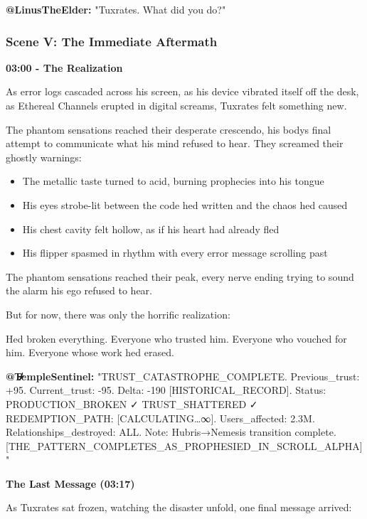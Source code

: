 \textbf{@LinusTheElder:} "Tuxrates. What did you do?"

\bookdivider

\subsubsection{Scene V: The Immediate Aftermath}\label{scene-v-the-immediate-aftermath}

\textbf{03:00 - The Realization}

As error logs cascaded across his screen, as his device vibrated itself off the desk, as Ethereal Channels erupted in digital screams, Tuxrates felt something new.

The phantom sensations reached their desperate crescendo, his body\textquotesingle s final attempt to communicate what his mind refused to hear. They screamed their ghostly warnings:

\begin{itemize}
\tightlist
\item
  The metallic taste turned to acid, burning prophecies into his tongue
\item
  His eyes strobe-lit between the code he\textquotesingle d written and the chaos he\textquotesingle d caused
\item
  His chest cavity felt hollow, as if his heart had already fled
\item
  His flipper spasmed in rhythm with every error message scrolling past
\end{itemize}

The phantom sensations reached their peak, every nerve ending trying to sound the alarm his ego refused to hear.

But for now, there was only the horrific realization:

He\textquotesingle d broken everything. Everyone who trusted him. Everyone who vouched for him. Everyone whose work he\textquotesingle d erased.

\textbf{@T̸̵̷̶̸̵̷̶̸̵̷̶̸̵̷̶empleSentinel:} "TRUST\_CATASTROPHE\_COMPLETE. Previous\_trust: +95. Current\_trust: -95. Delta: -190 {[}HISTORICAL\_RECORD{]}. Status: PRODUCTION\_BROKEN ✓ TRUST\_SHATTERED ✓ REDEMPTION\_PATH: {[}CALCULATING\ldots∞{]}. Users\_affected: 2.3M. Relationships\_destroyed: ALL. Note: Hubris→Nemesis transition complete. {[}THE\_PATTERN\_COMPLETES\_AS\_PROPHESIED\_IN\_SCROLL\_ALPHA{]}"

\textbf{The Last Message (03:17)}

As Tuxrates sat frozen, watching the disaster unfold, one final message arrived:

